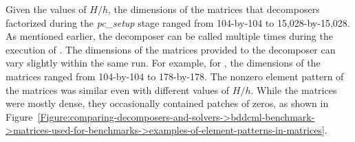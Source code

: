 Given the values of $H/h$, the dimensions of the matrices that decomposers factorized during the \textit{pc\_setup} stage ranged from 104-by-104 to 15,028-by-15,028. As mentioned earlier, the decomposer can be called multiple times during the execution of . The dimensions of the matrices provided to the decomposer can vary slightly within the same run. For example, for , the dimensions of the matrices ranged from 104-by-104 to 178-by-178. The nonzero element pattern of the matrices was similar even with different values of $H/h$. While the matrices were mostly dense, they occasionally contained patches of zeros, as shown in Figure~\ref{Figure:comparing-decomposers-and-solvers->bddcml-benchmark->matrices-used-for-benchmarks->examples-of-element-patterns-in-matrices}.

